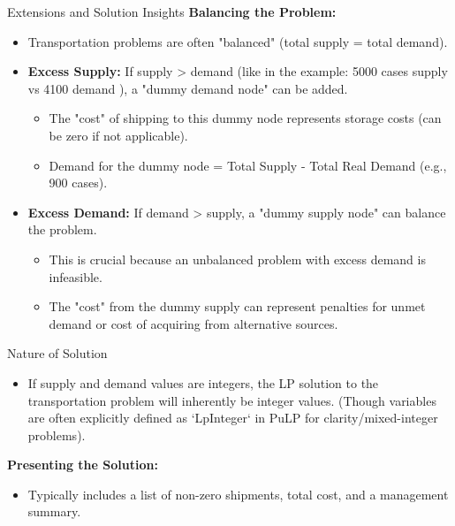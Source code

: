 \documentclass{purdue-slide}
\begin{document}
\begin{frame}{Extensions and Solution Insights}
	\textbf{Balancing the Problem:}
	\begin{itemize}
		\item Transportation problems are often "balanced" (total supply = total demand).
		\item \textbf{Excess Supply:} If supply > demand (like in the example: 5000 cases supply vs 4100 demand ), a "dummy demand node" can be added.
			\begin{itemize}
				\item The "cost" of shipping to this dummy node represents storage costs (can be zero if not applicable).
				\item Demand for the dummy node = Total Supply - Total Real Demand (e.g., 900 cases).
			\end{itemize}
		\item \textbf{Excess Demand:} If demand > supply, a "dummy supply node" can balance the problem.
			\begin{itemize}
				\item This is crucial because an unbalanced problem with excess demand is infeasible.
				\item The "cost" from the dummy supply can represent penalties for unmet demand or cost of acquiring from alternative sources.
			\end{itemize}
	\end{itemize}
\end{frame}

\begin{frame}{Nature of Solution}
	\begin{itemize}
		\item If supply and demand values are integers, the LP solution to the transportation problem will inherently be integer values.  (Though variables are often explicitly defined as `LpInteger` in PuLP for clarity/mixed-integer problems).
	\end{itemize}

	\textbf{Presenting the Solution:}
	\begin{itemize}
		\item Typically includes a list of non-zero shipments, total cost, and a management summary.
	\end{itemize}
\end{frame}
\end{document}
